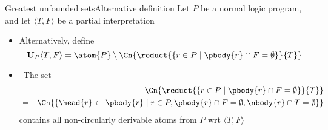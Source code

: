 \begin{frame}{Greatest unfounded sets}{Alternative definition}
  Let $P$ be a normal logic program,\\ and let
  $\langle T,F \rangle$ be a partial interpretation
  \medskip
  \begin{itemize}
  \item<1-> Alternatively, define
    \[
      \mathbf{U}_P\langle T,F \rangle =
      \atom{P} \setminus
      \Cn{\reduct{\{r \in P \mid \pbody{r} \cap F = \emptyset\}}{T}}
    \]
  \item<2->  \ The set
    \begin{eqnarray*}
      & & \Cn{\reduct{\{r \in P \mid \pbody{r} \cap F = \emptyset\}}{T}}\\
      &=& \Cn{\{\head{r}\leftarrow\pbody{r} \mid r\in P, \pbody{r} \cap F = \emptyset, \nbody{r}\cap T=\emptyset\}}
    \end{eqnarray*}
    contains all non-circularly derivable atoms from $P$ wrt $\langle T,F \rangle$
  \end{itemize}
\end{frame}
%
